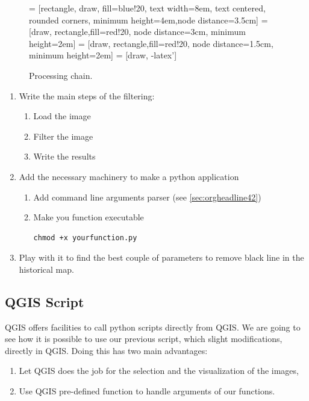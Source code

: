 \documentclass[a4paper,11pt,DIV=18]{scrartcl}
\begin{document}
\begin{figure}
 = [rectangle, draw, fill=blue!20, text width=8em, text centered, rounded corners, minimum height=4em,node distance=3.5cm]
   = [draw, rectangle,fill=red!20, node distance=3cm, minimum height=2em]
   = [draw, rectangle,fill=red!20, node distance=1.5cm, minimum height=2em]
   = [draw, -latex']
\caption{\label{orgspecialblock1}
Processing chain.}
\end{figure}

\begin{work}
\begin{enumerate}
\item Write the main steps of the filtering:
\begin{enumerate}
\item Load the image
\item Filter the image
\item Write the results
\end{enumerate}
\item Add the necessary machinery to make a python application
\begin{enumerate}
\item Add command line arguments parser (see \ref{sec:orgheadline42})
\item Make you function executable

\begin{verbatim}
chmod +x yourfunction.py
\end{verbatim}
\end{enumerate}
\item Play with it to find the best couple of parameters to remove black line in the historical map.
\end{enumerate}
\end{work}
\subsection{QGIS Script}
\label{sec:orgheadline46}
QGIS offers facilities  to call python scripts directly  from QGIS. We
are going to see how it is  possible to use our previous script, which
slight  modifications,  directly in  QGIS.  Doing  this has  two  main
advantages:
\begin{enumerate}
\item Let QGIS does the job for the selection and the visualization of
the images,
\item Use QGIS pre-defined function to handle arguments of our functions.
\end{enumerate}
\end{document}
